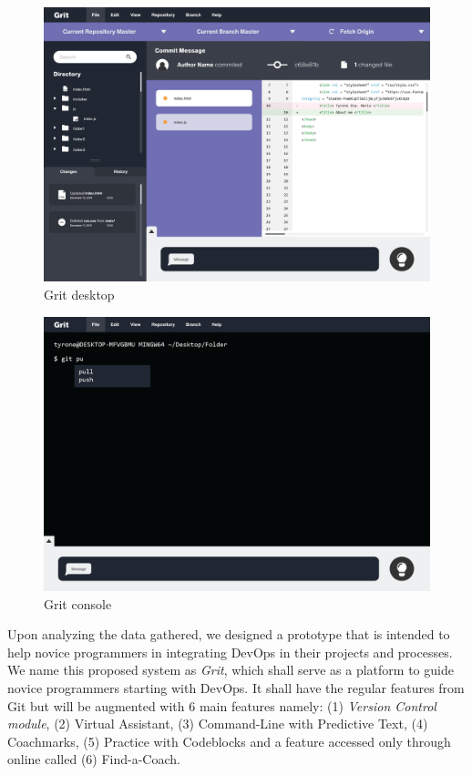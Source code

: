 \documentclass{sigchi}
\begin{document}
\begin{figure}
    \centering
    \includegraphics[scale=0.72]{figures/mockup1}
    \caption{Grit desktop}
    \label{fig:mockup}
\end{figure}

\begin{figure}
    \centering
    \includegraphics[scale=0.72]{figures/console1}
    \caption{Grit console}
    \label{fig:console}
\end{figure}

Upon analyzing the data gathered, we designed a prototype that is intended to help novice programmers in integrating DevOps in their projects and processes. We name this proposed system as \textit{Grit}, which shall serve as a platform to guide novice programmers starting with DevOps. It shall have the regular features from Git but will be augmented with 6 main features namely: (1) \textit{Version Control module}, (2) Virtual Assistant, (3) Command-Line with Predictive Text, (4) Coachmarks, (5) Practice with Codeblocks and a feature accessed only through online called (6) Find-a-Coach. 
\end{document}
